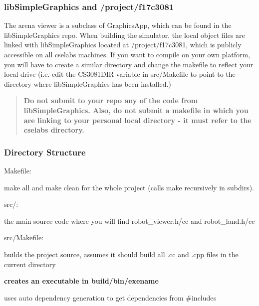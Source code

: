 \subsubsection*{lib\+Simple\+Graphics and /project/f17c3081}

The arena viewer is a subclass of Graphics\+App, which can be found in the lib\+Simple\+Graphics repo. When building the simulator, the local object files are linked with lib\+Simple\+Graphics located at {\ttfamily /project/f17c3081}, which is publicly accessible on all cselabs machines. If you want to compile on your own platform, you will have to create a similar directory and change the makefile to reflect your local drive (i.\+e. edit the C\+S3081\+D\+IR variable in src/\+Makefile to point to the directory where lib\+Simple\+Graphics has been installed.)

\begin{quote}
{\bfseries Do not submit to your repo any of the code from lib\+Simple\+Graphics. Also, do not submit a makefile in which you are linking to your personal local directory -\/ it must refer to the cselabs directory.} \end{quote}


\subsubsection*{Directory Structure}

Makefile\+:
\begin{DoxyItemize}
\item make all and make clean for the whole project (calls make recursively in subdirs).
\end{DoxyItemize}

src/\+:
\begin{DoxyItemize}
\item the main source code where you will find robot\+\_\+viewer.\+h/cc and robot\+\_\+land.\+h/cc
\end{DoxyItemize}

src/\+Makefile\+:
\begin{DoxyItemize}
\item builds the project source, assumes it should build all .cc and .cpp files in the current directory
\item {\bfseries creates an executable in build/bin/exename}
\item uses auto dependency generation to get dependencies from \#includes
\end{DoxyItemize}


